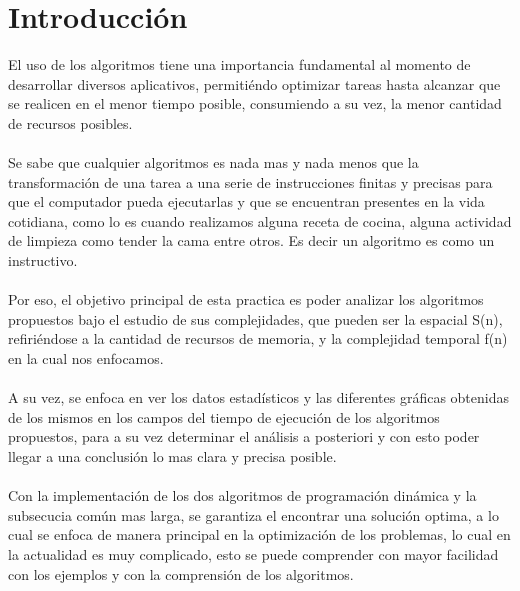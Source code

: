 \documentclass[12pt,twoside]{article}
\begin{document}
\section{Introducci\'on}
El uso de los algoritmos tiene una importancia fundamental al momento de desarrollar diversos aplicativos, permitiéndo optimizar tareas hasta alcanzar que se realicen en el menor tiempo posible, consumiendo a su vez, la menor cantidad de recursos posibles.
\\
\\
Se sabe que cualquier algoritmos es nada mas y nada menos que la transformación de una tarea a una serie de instrucciones finitas y  precisas para que el computador pueda ejecutarlas y que se encuentran presentes en la vida cotidiana, como lo es cuando realizamos alguna receta de cocina, alguna actividad de limpieza como tender la cama entre otros.
Es decir un algoritmo es como un instructivo.
\\
\\
 Por eso, el objetivo principal de esta practica es poder analizar los algoritmos propuestos bajo el estudio de sus complejidades, que pueden ser la espacial S(n), refiriéndose a la cantidad de recursos de memoria, y la complejidad temporal f(n) en la cual nos enfocamos.
\\
\\
 A su vez, se enfoca en ver los datos estadísticos y las diferentes gráficas obtenidas de los mismos en los campos del tiempo de ejecución de los algoritmos propuestos, para a su vez determinar el análisis a posteriori y con esto poder llegar a una conclusión lo mas clara y precisa posible. 
\\
\\
Con la implementación de los dos algoritmos de programación dinámica y la subsecucia común mas larga, se garantiza el encontrar una solución optima, a lo cual se enfoca de manera principal en la optimización de los problemas, lo cual en la actualidad es muy complicado, esto se puede comprender con mayor facilidad con los ejemplos y con la comprensión de los algoritmos.
\\
\newpage
\end{document}
